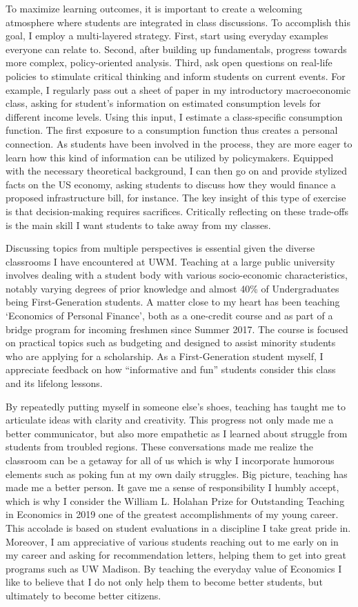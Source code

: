 \documentclass[a4paper,12pt]{article}
\begin{document}
To maximize learning outcomes, it is important to create a welcoming atmosphere where students are integrated in class discussions. To accomplish this goal, I employ a multi-layered strategy. First, start using everyday examples everyone can relate to. Second, after building up fundamentals, progress towards more complex, policy-oriented analysis. Third, ask open questions on real-life policies to stimulate critical thinking and inform students on current events. For example, I regularly pass out a sheet of paper in my introductory macroeconomic class, asking for student’s information on estimated consumption levels for different income levels. Using this input, I estimate a class-specific consumption function. The first exposure to a consumption function thus creates a personal connection. As students have been involved in the process, they are more eager to learn how this kind of information can be utilized by policymakers. Equipped with the necessary theoretical background, I can then go on and provide stylized facts on the US economy, asking students to discuss how they would finance a proposed infrastructure bill, for instance. The key insight of this type of exercise is that decision-making requires sacrifices. Critically reflecting on these trade-offs is the main skill I want students to take away from my classes. 


Discussing topics from multiple perspectives is essential given the diverse classrooms I have encountered at UWM. Teaching at a large public university involves dealing with a student body with various socio-economic characteristics, notably varying degrees of prior knowledge and almost 40\% of Undergraduates being First-Generation students. A matter close to my heart has been teaching `Economics of Personal Finance', both as a one-credit course and as part of a bridge program for incoming freshmen since Summer 2017.  The course is focused on practical topics such as budgeting and designed to assist minority students who are applying for a scholarship. As a First-Generation student myself, I appreciate feedback on how “informative and fun” students consider this class and its lifelong lessons. 

By repeatedly putting myself in someone else’s shoes, teaching has taught me to articulate ideas with clarity and creativity. This progress not only made me a better communicator, but also more empathetic as I learned about struggle from students from troubled regions. These conversations made me realize the classroom can be a getaway for all of us which is why I incorporate humorous elements such as poking fun at my own daily struggles. Big picture, teaching has made me a better person. It gave me a sense of responsibility I humbly accept, which is why I consider the William L. Holahan Prize for Outstanding Teaching in Economics in 2019 one of the greatest accomplishments of my young career. This accolade is based on student evaluations in a discipline I take great pride in. Moreover, I am appreciative of various students reaching out to me early on in my career and asking for recommendation letters, helping them to get into great programs such as UW Madison. By teaching the everyday value of Economics I like to believe that I do not only help them to become better students, but ultimately to become better citizens. 
\end{document}
